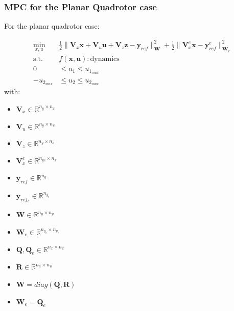 \documentclass{thesisbeamer}
\begin{document}
\begin{frame}
	\frametitle{MPC for the Planar Quadrotor case}
	
	For the planar quadrotor case:
	
	\begin{equation}\label{mpc_optimization_problem_planar_quadrotor}
\begin{aligned}
            \min_{x,u} \quad & \frac{1}{2}\|\bm{V}_x \bm{x} + \bm{V}_u \bm{u} + \bm{V}_z \bm{z} - \bm{y}_{ref}\|^2_{\bm{W}} + \frac{1}{2}\|\bm{V}_x^e \bm{x} - \bm{y}_{ref}^e \|^2_{\bm{W}_e} \\
            \textrm{s.t.} \quad & f(\bm{x},\bm{u}):\text{dynamics} \\
             0 &\leq u_1 \leq u_{1_{max}} \\
             - u_{2_{max}} &\leq u_2 \leq u_{2_{max}}
        \end{aligned}
\end{equation}
with: 
\begin{multicols}{3}
\begin{itemize}
	\item $\bm{V}_x \in \mathbb{R}^{n_y \times n_x}$
	\item $\bm{V}_u \in \mathbb{R}^{n_y \times n_u}$ 
	\item $\bm{V}_z \in \mathbb{R}^{n_y \times n_z}$
	\item $\bm{V}_x^e \in \mathbb{R}^{n_{ye}\times n_x}$
\end{itemize}
\columnbreak
\begin{itemize}
	\item $\bm{y}_{ref} \in \mathbb{R}^{n_y}$
	\item $\bm{y}_{ref_e} \in \mathbb{R}^{n_{y_e}}$
	\item $\bm{W} \in \mathbb{R}^{n_y \times n_y}$
	\item $\bm{W}_e \in \mathbb{R}^{n_{y_e} \times n_{y_e}}$
\end{itemize}
\columnbreak
\begin{itemize}
	\item $\bm{Q},\bm{Q}_e \in \mathbb{R}^{n_x \times n_x}$
	\item $\bm{R} \in \mathbb{R}^{n_u \times n_u}$
	\item $\bm{W} = diag(\bm{Q},\bm{R}) $
	\item $\bm{W}_e = \bm{Q}_e $
\end{itemize}
\end{multicols}
\end{frame}
\end{document}
